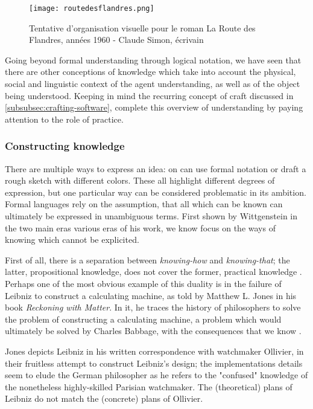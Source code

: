 \begin{figure}
    \texttt{[image: routedesflandres.png]}
    \caption{Tentative d'organisation visuelle pour le roman La Route des Flandres, années 1960 - Claude Simon, écrivain}
    \label{graphic:routedesflandres}
\end{figure}

Going beyond formal understanding through logical notation, we have seen that there are other conceptions of knowledge which take into account the physical, social and linguistic context of the agent understanding, as well as of the object being understood. Keeping in mind the recurring concept of craft discussed in \ref{subsubsec:crafting-software}, complete this overview of understanding by paying attention to the role of practice.

\subsubsection{Constructing knowledge}
\label{subsubsec:constructing-knowledge}

There are multiple ways to express an idea: on can use formal notation or draft a rough sketch with different colors. These all highlight different degrees of expression, but one particular way can be considered problematic in its ambition. Formal languages rely on the assumption, that all which can be known can ultimately be expressed in unambiguous terms. First shown by Wittgenstein in the two main eras various eras of his work, we know focus on the ways of knowing which cannot be explicited.

First of all, there is a separation between \emph{knowing-how} and \emph{knowing-that}; the latter, propositional knowledge, does not cover the former, practical knowledge \citep{ryle_concept_1951}. Perhaps one of the most obvious example of this duality is in the failure of Leibniz to construct a calculating machine, as told by Matthew L. Jones in his book \emph{Reckoning with Matter}. In it, he traces the history of philosophers to solve the problem of constructing a calculating machine, a problem which would ultimately be solved by Charles Babbage, with the consequences that we know \citep{jones_reckoning_2016}.

Jones depicts Leibniz in his written correspondence with watchmaker Ollivier, in their fruitless attempt to construct Leibniz's design; the implementations details seem to elude the German philosopher as he refers to the "confused" knowledge of the nonetheless highly-skilled Parisian watchmaker. The (theoretical) plans of Leibniz do not match the (concrete) plans of Ollivier.

